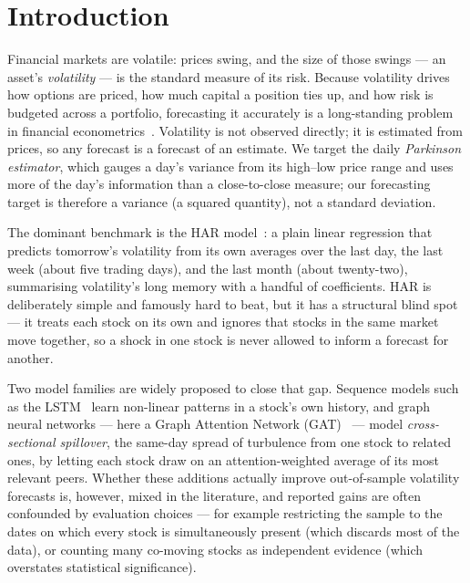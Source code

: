 \documentclass[runningheads]{llncs}
\begin{document}
\section{Introduction}
Financial markets are volatile: prices swing, and the size of those swings --- an asset's \emph{volatility} ---
is the standard measure of its risk. Because volatility drives how options are priced, how much capital a
position ties up, and how risk is budgeted across a portfolio, forecasting it accurately is a long-standing
problem in financial econometrics~\cite{corsi2009}. Volatility is not observed directly; it is estimated from
prices, so any forecast is a forecast of an estimate. We target the daily \emph{Parkinson estimator}, which
gauges a day's variance from its high--low price range and uses more of the day's information than a
close-to-close measure; our forecasting target is therefore a variance (a squared quantity), not a standard
deviation.

The dominant benchmark is the HAR model~\cite{corsi2009}: a plain linear regression that predicts tomorrow's
volatility from its own averages over the last day, the last week (about five trading days), and the last month
(about twenty-two), summarising volatility's long memory with a handful of coefficients. HAR is deliberately
simple and famously hard to beat, but it has a structural blind spot --- it treats each stock on its own and
ignores that stocks in the same market move together, so a shock in one stock is never allowed to inform a
forecast for another.

Two model families are widely proposed to close that gap. Sequence models such as the LSTM~\cite{lstm1997}
learn non-linear patterns in a stock's own history, and graph neural networks --- here a Graph Attention Network
(GAT)~\cite{gat2018} --- model \emph{cross-sectional spillover}, the same-day spread of turbulence from one stock
to related ones, by letting each stock draw on an attention-weighted average of its most relevant peers. Whether
these additions actually improve out-of-sample volatility forecasts is, however, mixed in the literature, and
reported gains are often confounded by evaluation choices --- for example restricting the sample to the dates on
which every stock is simultaneously present (which discards most of the data), or counting many co-moving stocks
as independent evidence (which overstates statistical significance).
\end{document}
